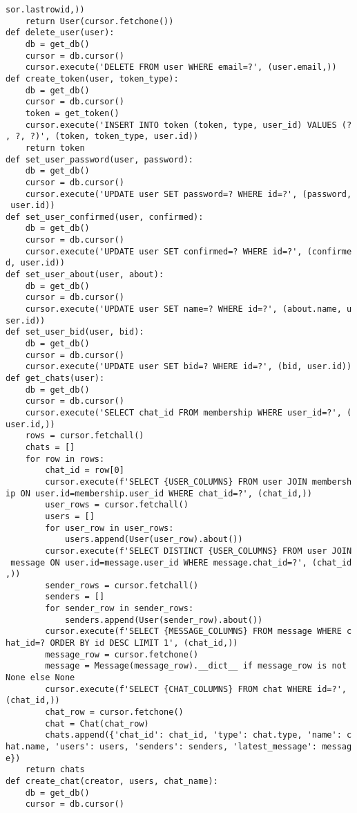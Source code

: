 \documentclass[listing]{espd}
\begin{document}
\begin{verbatim}
sor.lastrowid,))
    return User(cursor.fetchone())
def delete_user(user):
    db = get_db()
    cursor = db.cursor()
    cursor.execute('DELETE FROM user WHERE email=?', (user.email,))
def create_token(user, token_type):
    db = get_db()
    cursor = db.cursor()
    token = get_token()
    cursor.execute('INSERT INTO token (token, type, user_id) VALUES (?
, ?, ?)', (token, token_type, user.id))
    return token
def set_user_password(user, password):
    db = get_db()
    cursor = db.cursor()
    cursor.execute('UPDATE user SET password=? WHERE id=?', (password,
 user.id))
def set_user_confirmed(user, confirmed):
    db = get_db()
    cursor = db.cursor()
    cursor.execute('UPDATE user SET confirmed=? WHERE id=?', (confirme
d, user.id))
def set_user_about(user, about):
    db = get_db()
    cursor = db.cursor()
    cursor.execute('UPDATE user SET name=? WHERE id=?', (about.name, u
ser.id))
def set_user_bid(user, bid):
    db = get_db()
    cursor = db.cursor()
    cursor.execute('UPDATE user SET bid=? WHERE id=?', (bid, user.id))
def get_chats(user):
    db = get_db()
    cursor = db.cursor()
    cursor.execute('SELECT chat_id FROM membership WHERE user_id=?', (
user.id,))
    rows = cursor.fetchall()
    chats = []
    for row in rows:
        chat_id = row[0]
        cursor.execute(f'SELECT {USER_COLUMNS} FROM user JOIN membersh
ip ON user.id=membership.user_id WHERE chat_id=?', (chat_id,))
        user_rows = cursor.fetchall()
        users = []
        for user_row in user_rows:
            users.append(User(user_row).about())
        cursor.execute(f'SELECT DISTINCT {USER_COLUMNS} FROM user JOIN
 message ON user.id=message.user_id WHERE message.chat_id=?', (chat_id
,))
        sender_rows = cursor.fetchall()
        senders = []
        for sender_row in sender_rows:
            senders.append(User(sender_row).about())
        cursor.execute(f'SELECT {MESSAGE_COLUMNS} FROM message WHERE c
hat_id=? ORDER BY id DESC LIMIT 1', (chat_id,))
        message_row = cursor.fetchone()
        message = Message(message_row).__dict__ if message_row is not 
None else None
        cursor.execute(f'SELECT {CHAT_COLUMNS} FROM chat WHERE id=?', 
(chat_id,))
        chat_row = cursor.fetchone()
        chat = Chat(chat_row)
        chats.append({'chat_id': chat_id, 'type': chat.type, 'name': c
hat.name, 'users': users, 'senders': senders, 'latest_message': messag
e})
    return chats
def create_chat(creator, users, chat_name):
    db = get_db()
    cursor = db.cursor()
    

\end{verbatim}
\end{document}
